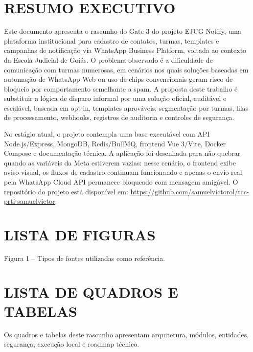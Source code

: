 \documentclass[12pt,letterpaper,oneside]{report}
\newcommand{\RepositorioProjeto}{https://github.com/samuelvictorol/tcc-prti-samuelvictor}
\begin{document}
\setcounter{page}{3}
\pagestyle{plain}

\chapter*{RESUMO EXECUTIVO}

Este documento apresenta o rascunho do Gate 3 do projeto EJUG Notify, uma plataforma institucional para cadastro de contatos, turmas, templates e campanhas de notificação via WhatsApp Business Platform, voltada ao contexto da Escola Judicial de Goiás. O problema observado é a dificuldade de comunicação com turmas numerosas, em cenários nos quais soluções baseadas em automação de WhatsApp Web ou uso de chips convencionais geram risco de bloqueio por comportamento semelhante a spam. A proposta deste trabalho é substituir a lógica de disparo informal por uma solução oficial, auditável e escalável, baseada em opt-in, templates aprováveis, segmentação por turmas, filas de processamento, webhooks, registros de auditoria e controles de segurança.

No estágio atual, o projeto contempla uma base executável com API Node.js/Express, MongoDB, Redis/BullMQ, frontend Vue 3/Vite, Docker Compose e documentação técnica. A aplicação foi desenhada para não quebrar quando as variáveis da Meta estiverem vazias: nesse cenário, o frontend exibe aviso visual, os fluxos de cadastro continuam funcionando e apenas o envio real pela WhatsApp Cloud API permanece bloqueado com mensagem amigável. O repositório do projeto está disponível em: \url{\RepositorioProjeto}.

\clearpage

\chapter*{LISTA DE FIGURAS}
Figura 1 -- Tipos de fontes utilizadas como referência.
\clearpage

\chapter*{LISTA DE QUADROS E TABELAS}
Os quadros e tabelas deste rascunho apresentam arquitetura, módulos, entidades, segurança, execução local e roadmap técnico.
\clearpage
\end{document}
